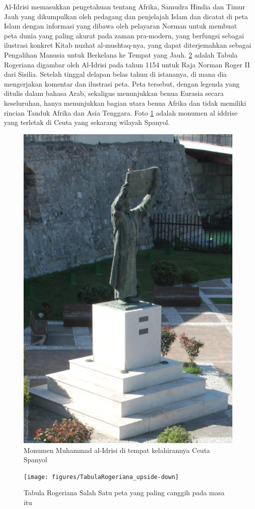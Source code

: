 	Al-Idrisi memasukkan pengetahuan tentang Afrika, Samudra Hindia dan Timur Jauh yang dikumpulkan oleh pedagang dan penjelajah Islam dan dicatat di peta Islam dengan informasi yang dibawa oleh pelayaran Norman untuk membuat peta dunia yang paling akurat pada zaman pra-modern, yang berfungsi sebagai ilustrasi konkret Kitab nuzhat al-mushtaq-nya, yang dapat diterjemahkan sebagai Pengalihan Manusia untuk Berkelana ke Tempat yang Jauh. 
	\ref{TabulaRogeriana_upside-down} adalah Tabula Rogeriana digambar oleh Al-Idrisi pada tahun 1154 untuk Raja Norman Roger II dari Sisilia. Setelah tinggal delapan belas tahun di istananya, di mana dia mengerjakan komentar dan ilustrasi peta. Peta tersebut, dengan legenda yang ditulis dalam bahasa Arab, sekaligus menunjukkan benua Eurasia secara keseluruhan, hanya menunjukkan bagian utara benua Afrika dan tidak memiliki rincian Tanduk Afrika dan Asia Tenggara. Foto \ref{Fotoal-Idrisi} adalah monumen al iddrise yang terletak di Ceuta yang sekarang wilayah Spanyol.
	\begin{figure} [ht]
	\centerline{\includegraphics[width=.5\textwidth]{figures/monumenaliddrisi}}
	\caption{Monumen Muhammad al-Idrisi di tempat kelahirannya Ceuta Spanyol}
	\label{Fotoal-Idrisi}
	\end{figure}
	 
	
	\begin{figure} [ht]
	\centerline{\texttt{[image: figures/TabulaRogeriana\_upside-down]}}
	\caption{Tabula Rogeriana Salah Satu peta yang paling canggih pada masa itu}
	\label{TabulaRogeriana_upside-down}
	\end{figure}
	
